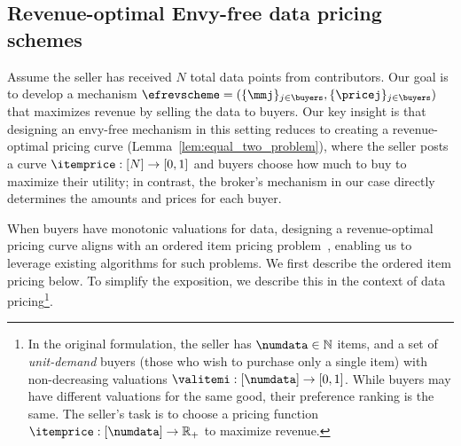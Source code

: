 





\subsection{Revenue-optimal Envy-free data pricing schemes}
\label{sec:efrevenueoptimal}

Assume the seller has received $N$ total data points from contributors.  
Our goal is to develop a mechanism $\efrevscheme = (\{\mmj\}_{j \in \buyers}, \{\pricej\}_{j \in \buyers})$ that maximizes revenue by selling the data to buyers.  
Our key insight is that designing an envy-free mechanism in this setting reduces to creating a revenue-optimal pricing curve (Lemma~\ref{lem:equal_two_problem}), where the seller posts a curve $\itemprice: [N] \to [0,1]$ and buyers choose how much to buy to maximize their utility;  in contrast, the broker's mechanism in our case directly determines the amounts and prices for each buyer.  

When buyers have monotonic valuations for data, designing a revenue-optimal pricing curve aligns with an ordered item pricing problem~\citep{chawla2022pricing}, enabling us to leverage existing algorithms for such problems.  
We first describe the ordered item pricing below.
To simplify the exposition, we describe this in the context of data pricing\footnote{In the original formulation, the seller has $\numdata \in \mathbb{N}$ items, and a set of \emph{unit-demand} buyers (those who wish to purchase only a single item) with non-decreasing valuations $\valitemi: [\numdata] \to [0,1]$. While buyers may have different valuations for the same good, their preference ranking is the same. The seller's task is to choose a pricing function $\itemprice: [\numdata] \to \mathbb{R}_+$ to maximize revenue.}.



